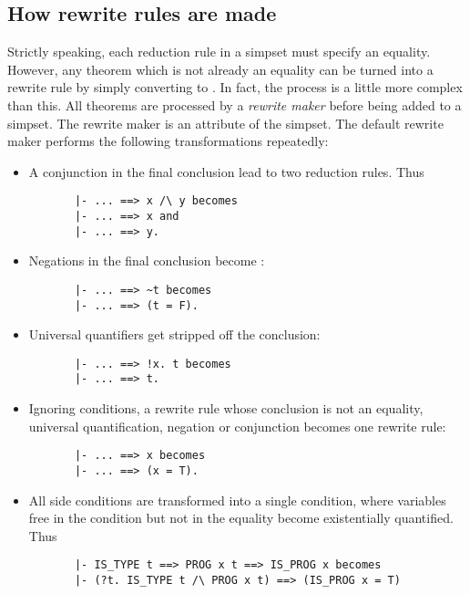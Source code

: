 \documentclass[a4]{article}
\begin{document}
\subsection{How rewrite rules are made}

Strictly speaking, each reduction rule in a simpset must specify an
equality. However, any theorem which is not already an
equality can be turned into a rewrite rule by simply
converting  to .
In fact, the process is a little more complex than this.
All theorems are processed by a {\em rewrite maker}
before being added to a simpset.  The rewrite maker is
an attribute of the simpset.  The default rewrite maker
performs the following transformations repeatedly:
\begin{itemize}
    \item A conjunction in the final conclusion lead to
    two reduction rules.  Thus
\begin{hol} \begin{verbatim}
       |- ... ==> x /\ y becomes
       |- ... ==> x and
       |- ... ==> y.
\end{verbatim} \end{hol}

    \item Negations  in the final conclusion become :
    \begin{hol} \begin{verbatim}
       |- ... ==> ~t becomes
       |- ... ==> (t = F).
\end{verbatim} \end{hol}

    \item Universal quantifiers get stripped off the
    conclusion:
    \begin{hol} \begin{verbatim}
       |- ... ==> !x. t becomes
       |- ... ==> t.
\end{verbatim} \end{hol}

    \item Ignoring conditions, a rewrite rule whose conclusion
    is not an equality, universal quantification,
    negation or conjunction becomes one rewrite rule:
    \begin{hol} \begin{verbatim}
       |- ... ==> x becomes
       |- ... ==> (x = T).
\end{verbatim} \end{hol}

    \item All side conditions are transformed into a single condition,
    where variables free in the condition but not in the equality
    become existentially quantified.  Thus
    \begin{hol} \begin{verbatim}
       |- IS_TYPE t ==> PROG x t ==> IS_PROG x becomes
       |- (?t. IS_TYPE t /\ PROG x t) ==> (IS_PROG x = T)
\end{verbatim} \end{hol}
\end{itemize}
\end{document}
